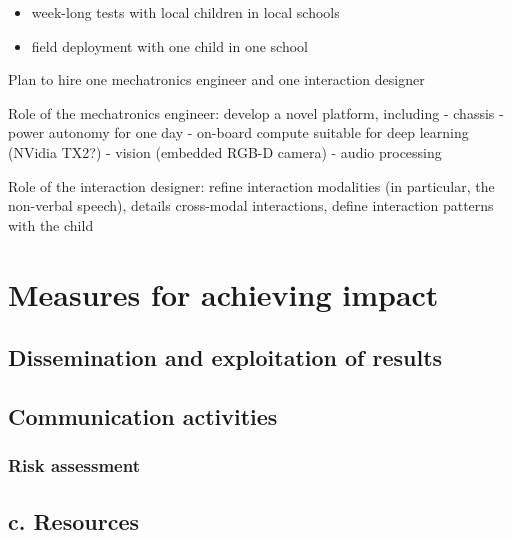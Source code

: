 \documentclass[11pt,a4paper]{report}
\begin{document}
\begin{itemize}
    \item week-long tests with local children in local schools
    \item field deployment with one child in one school
\end{itemize}


Plan to hire one mechatronics engineer and one interaction designer

Role of the mechatronics engineer: develop a novel platform, including -
chassis - power autonomy for one day - on-board compute suitable for
deep learning (NVidia TX2?) - vision (embedded RGB-D camera) - audio
processing

Role of the interaction designer: refine interaction modalities (in
particular, the non-verbal speech), details cross-modal interactions,
define interaction patterns with the child




\section{Measures for achieving impact}

\subsection{Dissemination and exploitation of results}

\subsection{Communication activities}



\hypertarget{risk-assessment}{%
\subsubsection{Risk assessment}\label{risk-assessment}}

\hypertarget{c.-resources}{%
\subsection{c. Resources}\label{c.-resources}}
\end{document}
